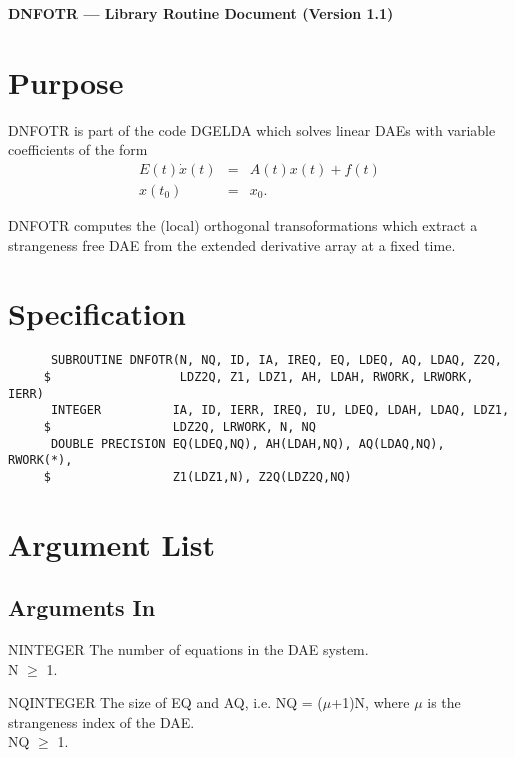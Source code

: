 


\begin{center}
  {\bf DNFOTR --- Library Routine Document (Version 1.1)}
\end{center}

\section{Purpose}

DNFOTR is part of the code DGELDA \cite{KunMRW95} which solves linear
DAEs with variable coefficients of the form 
\begin{eqnarray*}
  E(t)\dot{x}(t) &=& A(t)x(t) + f(t)\\
  x(t_0) &=& x_0.
\end{eqnarray*}

DNFOTR computes the (local) orthogonal transoformations which extract a
strangeness free DAE from the extended derivative array at a fixed
time. 
 
\section{Specification}

\begin{verbatim}
      SUBROUTINE DNFOTR(N, NQ, ID, IA, IREQ, EQ, LDEQ, AQ, LDAQ, Z2Q,
     $                  LDZ2Q, Z1, LDZ1, AH, LDAH, RWORK, LRWORK, IERR) 
      INTEGER          IA, ID, IERR, IREQ, IU, LDEQ, LDAH, LDAQ, LDZ1, 
     $                 LDZ2Q, LRWORK, N, NQ
      DOUBLE PRECISION EQ(LDEQ,NQ), AH(LDAH,NQ), AQ(LDAQ,NQ), RWORK(*), 
     $                 Z1(LDZ1,N), Z2Q(LDZ2Q,NQ)
\end{verbatim}

\section{Argument List}

\subsection{Arguments In}

\begin{entry}{N}{INTEGER}
  The number of equations in the DAE system. \\
  N $\ge$ 1.
\end{entry}

\begin{entry}{NQ}{INTEGER}
  The size of EQ and AQ, i.e. NQ = ($\mu$+1)N, where $\mu$ is
  the strangeness index of the DAE. \\
  NQ  $\ge$ 1.
\end{entry}


